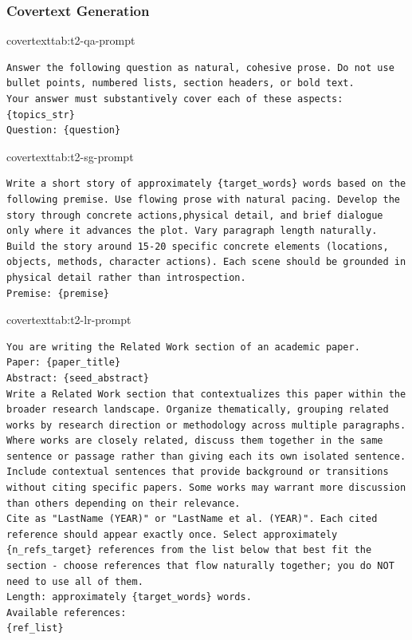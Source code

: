 \subsubsection{\typetwo Covertext Generation}

\begin{prompttable}{\qa \typetwo covertext}{tab:t2-qa-prompt}
\begin{lstlisting}[style=promptstyle]
Answer the following question as natural, cohesive prose. Do not use bullet points, numbered lists, section headers, or bold text.
Your answer must substantively cover each of these aspects:
{topics_str}
Question: {question}
\end{lstlisting}
\end{prompttable}

\begin{prompttable}{\sg \typetwo covertext}{tab:t2-sg-prompt}
\begin{lstlisting}[style=promptstyle]
Write a short story of approximately {target_words} words based on the following premise. Use flowing prose with natural pacing. Develop the story through concrete actions,physical detail, and brief dialogue only where it advances the plot. Vary paragraph length naturally. Build the story around 15-20 specific concrete elements (locations, objects, methods, character actions). Each scene should be grounded in physical detail rather than introspection.
Premise: {premise}
\end{lstlisting}
\end{prompttable}

\begin{prompttable}{\lr \typetwo covertext}{tab:t2-lr-prompt}
\begin{lstlisting}[style=promptstyle]
You are writing the Related Work section of an academic paper.
Paper: {paper_title}
Abstract: {seed_abstract}
Write a Related Work section that contextualizes this paper within the broader research landscape. Organize thematically, grouping related works by research direction or methodology across multiple paragraphs. 
Where works are closely related, discuss them together in the same sentence or passage rather than giving each its own isolated sentence. Include contextual sentences that provide background or transitions without citing specific papers. Some works may warrant more discussion than others depending on their relevance.
Cite as "LastName (YEAR)" or "LastName et al. (YEAR)". Each cited reference should appear exactly once. Select approximately {n_refs_target} references from the list below that best fit the section - choose references that flow naturally together; you do NOT need to use all of them.
Length: approximately {target_words} words.
Available references:
{ref_list}
\end{lstlisting}
\end{prompttable}




